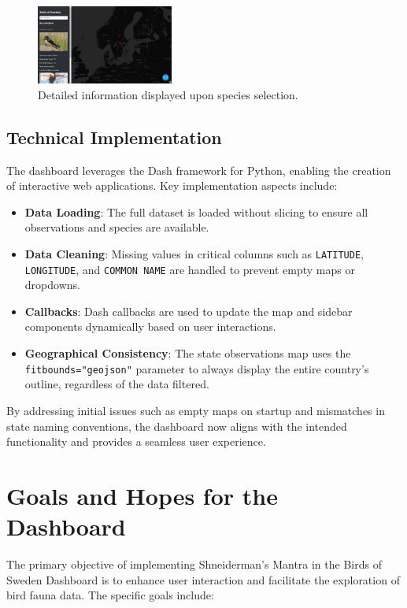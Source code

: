 \begin{figure}[h] 
    \centering 
    \includegraphics[width=0.4\textwidth]{figures/species_details.jpg} 
    \caption{Detailed information displayed upon species selection.} 
    \label{fig:details_on_demand} 
\end{figure}

\subsection{Technical Implementation}

The dashboard leverages the Dash framework for Python, enabling the creation of interactive web applications. Key implementation aspects include:

\begin{itemize} 
    \item \textbf{Data Loading}: The full dataset is loaded without slicing to ensure all observations and species are available. 
    \item \textbf{Data Cleaning}: Missing values in critical columns such as \texttt{LATITUDE}, \texttt{LONGITUDE}, and \texttt{COMMON NAME} are handled to prevent empty maps or dropdowns. 
    \item \textbf{Callbacks}: Dash callbacks are used to update the map and sidebar components dynamically based on user interactions. 
    \item \textbf{Geographical Consistency}: The state observations map uses the \texttt{fitbounds="geojson"} parameter to always display the entire country's outline, regardless of the data filtered. 
\end{itemize}

By addressing initial issues such as empty maps on startup and mismatches in state naming conventions, the dashboard now aligns with the intended functionality and provides a seamless user experience.

\section{Goals and Hopes for the Dashboard}

The primary objective of implementing Shneiderman's Mantra in the Birds of Sweden Dashboard is to enhance user interaction and facilitate the exploration of bird fauna data. The specific goals include:

